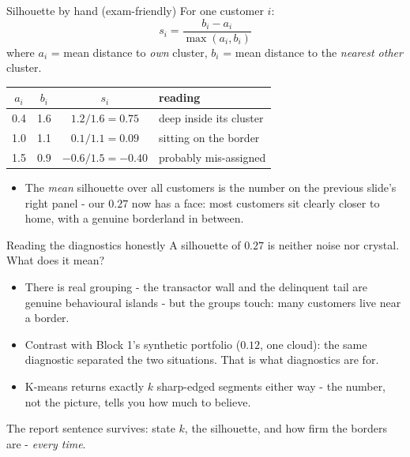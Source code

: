 \documentclass[10pt,aspectratio=169]{beamer}
\begin{document}
\begin{frame}{Silhouette by hand (exam-friendly)}
  For one customer $i$:
  \[
    s_i = \frac{b_i - a_i}{\max(a_i, b_i)}
  \]
  where $a_i$ = mean distance to \emph{own} cluster,
  $b_i$ = mean distance to the \emph{nearest other} cluster.
  \vspace{0.3em}
  \begin{center}\small
  \begin{tabular}{@{}cccl@{}}
    \toprule
    $a_i$ & $b_i$ & $s_i$ & reading \\
    \midrule
    0.4 & 1.6 & $1.2/1.6 = \mathbf{0.75}$ & deep inside its cluster \\
    1.0 & 1.1 & $0.1/1.1 = \mathbf{0.09}$ & sitting on the border \\
    1.5 & 0.9 & $-0.6/1.5 = \mathbf{-0.40}$ & probably mis-assigned \\
    \bottomrule
  \end{tabular}
  \end{center}
  \vspace{0.4em}
  \begin{itemize}\small
    \item The \emph{mean} silhouette over all customers is the number on
          the previous slide's right panel - our $0.27$ now has a face:
          most customers sit clearly closer to home, with a genuine
          borderland in between.
  \end{itemize}
\end{frame}

\begin{frame}{Reading the diagnostics honestly}
  A silhouette of $0.27$ is neither noise nor crystal. What does it mean?
  \begin{itemize}
    \item There \alert{is} real grouping - the transactor wall and the
          delinquent tail are genuine behavioural islands - but the
          groups touch: many customers live near a border.
    \item Contrast with Block 1's synthetic portfolio ($0.12$, one cloud):
          the \alert{same diagnostic} separated the two situations. That
          is what diagnostics are for.
    \item K-means returns exactly $k$ sharp-edged segments \alert{either
          way} - the number, not the picture, tells you how much to
          believe.
  \end{itemize}
  \vspace{0.5em}
  \begin{center}
    The report sentence survives: state $k$, the silhouette, and how firm
    the borders are - \emph{every time}.
  \end{center}
\end{frame}
\end{document}
